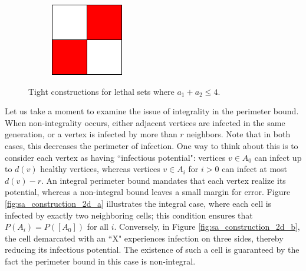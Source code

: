 \begin{figure}[]
\begin{subfigure}{0.1\textwidth}
\end{subfigure} \hfill%
\begin{subfigure}{0.06\textwidth}
	\includegraphics[width=\textwidth]{figures/1/2x2x1.pdf}
\end{subfigure}
\hspace*{\fill}
\caption{Tight constructions for lethal sets where $a_1+a_2 \leq 4$.}
\label{fig:base_cases}
\end{figure} 

Let us take a moment to examine the issue of integrality in the perimeter bound. When non-integrality occurs, either adjacent vertices are infected in the same generation, or a vertex is infected by more than $r$ neighbors. Note that in both cases, this decreases the perimeter of infection. One way to think about this is to consider each vertex as having ``infectious potential": vertices $v \in A_0$ can infect up to $d(v)$ healthy vertices, whereas vertices $v \in A_i$ for $i > 0$ can infect at most $d(v) - r$. An integral perimeter bound mandates that each vertex realize its potential, whereas a non-integral bound leaves a small margin for error. Figure \ref{fig:sa_construction_2d_a} illustrates the integral case, where each cell is infected by exactly two neighboring cells; this condition ensures that $P(A_i) = P([A_0])$ for all $i$. Conversely, in Figure \ref{fig:sa_construction_2d_b}, the cell demarcated with an ``X" experiences infection on three sides, thereby reducing its infectious potential. The existence of such a cell is guaranteed by the fact the perimeter bound in this case is non-integral. 

